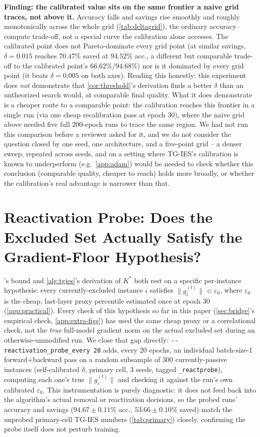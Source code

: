 \documentclass{article}
\theoremstyle{plain}
\theoremstyle{definition}
\theoremstyle{remark}
\begin{document}
\textbf{Finding: the calibrated value sits on the same frontier a naive grid traces, not above it.} Accuracy falls and savings rise smoothly and roughly monotonically across the whole grid (\cref{tab:deltagrid}), the ordinary accuracy--compute trade-off, not a special curve the calibration alone accesses. The calibrated point does not Pareto-dominate every grid point (at similar savings, $\delta{=}0.015$ reaches $70.47\%$ saved at $94.52\%$ acc., a different but comparable trade-off to the calibrated point's $66.62\%$/$94.68\%$) nor is it dominated by every grid point (it beats $\delta{=}0.005$ on both axes). Reading this honestly: this experiment does \emph{not} demonstrate that \cref{cor:threshold}'s derivation finds a better $\delta$ than an untheorized search would, at comparable final quality. What it does demonstrate is a cheaper route to a comparable point: the calibration reaches this frontier in a single run (via one cheap recalibration pass at epoch 30), where the naive grid above needed five full $200$-epoch runs to trace the same region. We had not run this comparison before a reviewer asked for it, and we do not consider the question closed by one seed, one architecture, and a five-point grid -- a denser sweep, repeated across seeds, and on a setting where TG-IES's calibration is known to underperform (e.g.\ \cref{app:adam}) would be needed to check whether this conclusion (comparable quality, cheaper to reach) holds more broadly, or whether the calibration's real advantage is narrower than that.

\section{Reactivation Probe: Does the Excluded Set Actually Satisfy the Gradient-Floor Hypothesis?}
\label{app:reactprobe}

's bound and \cref{alg:tgies}'s derivation of $K^*$ both rest on a specific per-instance hypothesis: every currently-excluded instance $i$ satisfies $\|g_i^{(t)}\|<\varepsilon_0$, where $\varepsilon_0$ is the cheap, last-layer proxy percentile estimated once at epoch 30 (\cref{app:practical}). Every check of this hypothesis so far in this paper (\cref{sec:bridge}'s empirical check, \cref{app:extra-figs}) has used the same cheap proxy or a correlational check, not the \emph{true} full-model gradient norm on the actual excluded set during an otherwise-unmodified run. We close that gap directly: \texttt{-{}-reactivation\_probe\_every 20} adds, every 20 epochs, an individual batch-size-1 forward+backward pass on a random subsample of $300$ currently-passive instances (self-calibrated $\delta$, primary cell, 3 seeds, tagged \texttt{\_reactprobe}), computing each one's true $\|g_i^{(t)}\|$ and checking it against the run's own calibrated $\varepsilon_0$. This instrumentation is purely diagnostic: it does not feed back into the algorithm's actual removal or reactivation decisions, so the probed runs' accuracy and savings ($94.67\pm0.11\%$ acc., $53.66\pm0.10\%$ saved) match the unprobed primary-cell TG-IES numbers (\cref{tab:primary}) closely, confirming the probe itself does not perturb training.
\end{document}
